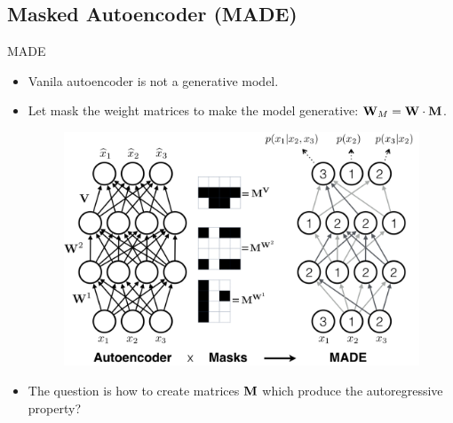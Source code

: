 \subsection{Masked Autoencoder (MADE)}
\begin{frame}{MADE}
	\begin{itemize}
		\item Vanila autoencoder is not a generative model.
		\item Let mask the weight matrices to make the model generative: $\mathbf{W}_M = \mathbf{W} \cdot \mathbf{M}$.
		\begin{figure}
		    \centering
		    \includegraphics[width=0.7\linewidth]{figs/made}
		\end{figure}
		\item The question is how to create matrices $\mathbf{M}$ which produce the autoregressive property?
	\end{itemize}
\end{frame}
